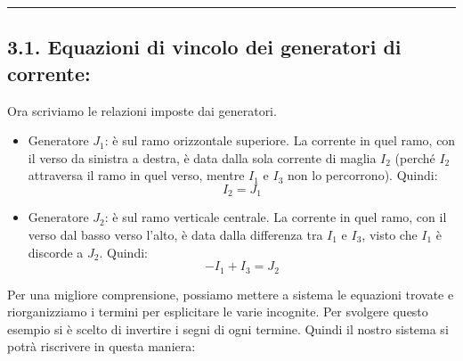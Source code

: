 \hrule

\subsection*{3.1. Equazioni di vincolo dei generatori di corrente:}

Ora scriviamo le relazioni imposte dai generatori.

\begin{itemize}
    \item Generatore \(J_1\): è sul ramo orizzontale superiore. La corrente in quel ramo, con il verso da sinistra a destra, è data dalla sola corrente di maglia \(I_2\) (perché \(I_2\) attraversa il ramo in quel verso, mentre \(I_1\) e \(I_3\) non lo percorrono). Quindi:
          \begin{equation}
              I_2 = J_1
              \label{eq:vincoloJ1}
          \end{equation}
    \item Generatore \(J_2\): è sul ramo verticale centrale. La corrente in quel ramo, con il verso dal basso verso l’alto, è data dalla differenza tra \(I_1\) e \(I_3\), visto che $I_1$ è discorde a $J_2$. Quindi:
          \begin{equation}
              - I_1 + I_3 = J_2
              \label{eq:vincoloJ2}
          \end{equation}
\end{itemize}


Per una migliore comprensione, possiamo mettere a sistema le equazioni trovate e riorganizziamo i termini per esplicitare le varie incognite. Per svolgere questo esempio si è scelto di invertire i segni di ogni termine.
Quindi il nostro sistema si potrà riscrivere in questa maniera:

